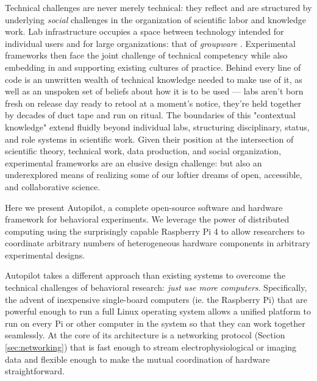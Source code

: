 Technical challenges are never merely technical: they reflect and are structured by underlying \textit{social} challenges in the organization of scientific labor and knowledge work. Lab infrastructure occupies a space between technology intended for individual users and for large organizations: that of \textit{groupware} \citep{johnson-lenzGroupwareCoiningDefining1998,johnson-lenzPostmechanisticGroupwarePrimitives1991}. Experimental frameworks then face the joint challenge of technical competency while also embedding in and supporting existing cultures of practice. Behind every line of code is an unwritten wealth of technical knowledge needed to make use of it, as well as an unspoken set of beliefs about how it is to be used --- labs aren't born fresh on release day ready to retool at a moment's notice, they're held together by decades of duct tape and run on ritual. The boundaries of this "contextual knowledge" extend fluidly beyond individual labs, structuring disciplinary, status, and role systems in scientific work\citep{barleyBackroomsScienceWork1994}. Given their position at the intersection of scientific theory, technical work, data production, and social organization, experimental frameworks are an elusive design challenge: but also an underexplored means of realizing some of our loftier dreams of open, accessible, and collaborative science. 

\vspace{12pt}

Here we present Autopilot, a complete open-source software and hardware framework for behavioral experiments. We leverage the power of distributed computing using the surprisingly capable Raspberry Pi 4 to allow researchers to coordinate arbitrary numbers of heterogeneous hardware components in arbitrary experimental designs.

Autopilot takes a different approach than existing systems to overcome the technical challenges of behavioral research: \textit{just use more computers}. Specifically, the advent of inexpensive single-board computers (ie. the Raspberry Pi) that are powerful enough to run a full Linux operating system allows a unified platform to run on every Pi or other computer in the system so that they can work together seamlessly. At the core of its architecture is a networking protocol (Section \ref{sec:networking}) that is fast enough to stream electrophysiological or imaging data and flexible enough to make the mutual coordination of hardware straightforward. 

